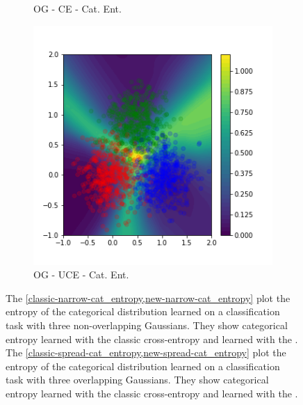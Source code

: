 \begin{figure}[H]
\begin{subfigure}{0.24\textwidth}
        \caption{OG - CE - Cat. Ent.}
        \label{classic-spread-cat_entropy}
    \end{subfigure}
    \begin{subfigure}{0.24\textwidth}
        \centering
        \includegraphics[width=\linewidth]{sections/010_neurips2019/paper/images/new-spread-cat_entropy.png}
        \caption{OG - UCE - Cat. Ent.}
        \label{new-spread-cat_entropy}
    \end{subfigure}
    \caption{The \cref{classic-narrow-cat_entropy,new-narrow-cat_entropy} plot the entropy of the categorical distribution learned on a classification task with three non-overlapping Gaussians. They show categorical entropy learned with the classic cross-entropy and learned with the \UncertaintyLoss. The \cref{classic-spread-cat_entropy,new-spread-cat_entropy} plot the entropy of the categorical distribution learned  on a classification task with three overlapping Gaussians. They show categorical entropy learned with the classic cross-entropy and learned with the \UncertaintyLoss.}
    \label{fig:entropy_classification}
\end{figure}


